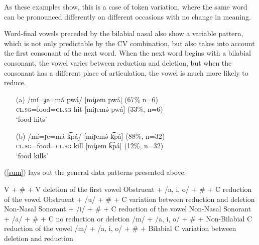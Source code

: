 \documentclass[output=paper,newtxmath,modfonts,nonflat,draftmode]{langsci/langscibook}
\begin{document}
As these examples show, this is a case of token variation, where the same word can be pronounced differently on different occasions with no change in meaning. 

Word-final vowels preceded by the bilabial nasal also show a variable pattern, which is not only predictable by the CV combination, but also takes into account the first consonant of the next word. When the next word begins with a bilabial consonant, the vowel varies between reduction and deletion, but when the consonant has a different place of articulation, the vowel is much more likely to reduce. 

\ea \label{m}
\begin{enumerate}
\item[(a)]
\gll /mí=ɟe=má pwá/ \hspace{0.5cm} [míɟem pwá] (67\% n=6)\\
 \textsc{cl.sg}=food=\textsc{cl.sg} hit  \hspace{0.5cm} [míɟemə́ pwá] (33\%, n=6)\\ 
\glt `food hits'

\item[(b)] 
\gll /mí=ɟe=má k͡pá/ \hspace{.5cm} [míɟemə́ k͡pá] (88\%, n=32)\\
\textsc{cl.sg}=food=\textsc{cl.sg} kill \hspace{0.5cm} [míɟem k͡pá] (12\%, n=32)\\
\glt `food kills'

\end{enumerate}
\z

(\ref{sum}) lays out the general data patterns presented above:

\ea \label{sum}

V + \# + V \hfill deletion of the first vowel \newline
Obstruent + /a, i, o/ + \# + C \hfill reduction of the vowel\newline
Obstruent + /u/ + \# + C \hfill variation between reduction and deletion\newline
Non-Nasal Sonorant + /i/ + \# + C \hfill reduction of the vowel\newline
Non-Nasal Sonorant + /a/ + \# + C \hfill no reduction or deletion\newline
/m/ + /a, i, o/ + \# + Non-Bilabial C \hfill reduction of the vowel\newline
/m/ + /a, i, o/ + \# + Bilabial C \hfill variation between deletion and reduction\newline
\end{document}
